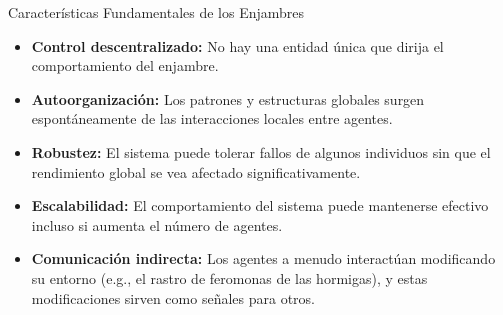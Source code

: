 \documentclass[aspectratio=169,xcolor=dvipsnames]{beamer}
\begin{document}

\begin{frame}{Características Fundamentales de los Enjambres}
    \begin{itemize}
        \item \textbf{Control descentralizado:} No hay una entidad única que dirija el comportamiento del enjambre. \pause
        \item \textbf{Autoorganización:} Los patrones y estructuras globales surgen espontáneamente de las interacciones locales entre agentes. \pause
        \item \textbf{Robustez:} El sistema puede tolerar fallos de algunos individuos sin que el rendimiento global se vea afectado significativamente. \pause
        \item \textbf{Escalabilidad:} El comportamiento del sistema puede mantenerse efectivo incluso si aumenta el número de agentes. \pause
        \item \textbf{Comunicación indirecta:} Los agentes a menudo interactúan modificando su entorno (e.g., el rastro de feromonas de las hormigas), y estas modificaciones sirven como señales para otros.
    \end{itemize}
\end{frame}

\end{document}
